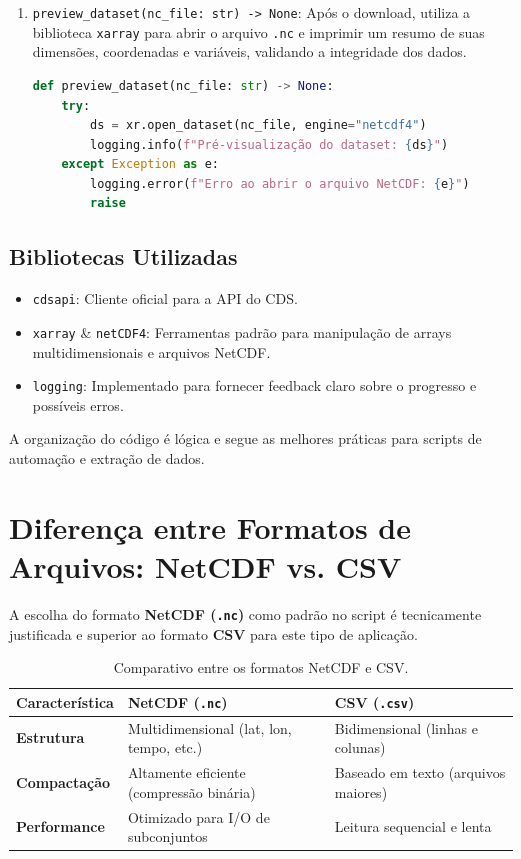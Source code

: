 \documentclass[12pt, a4paper]{article}
\begin{document}
\begin{enumerate}
    \item \texttt{preview\_dataset(nc\_file: str) -> None}: Após o download, utiliza a biblioteca \texttt{xarray} para abrir o arquivo \texttt{.nc} e imprimir um resumo de suas dimensões, coordenadas e variáveis, validando a integridade dos dados.
\begin{lstlisting}[language=Python]
def preview_dataset(nc_file: str) -> None:
    try:
        ds = xr.open_dataset(nc_file, engine="netcdf4")
        logging.info(f"Pré-visualização do dataset: {ds}")
    except Exception as e:
        logging.error(f"Erro ao abrir o arquivo NetCDF: {e}")
        raise
\end{lstlisting}

\end{enumerate}

\subsection{Bibliotecas Utilizadas}
\begin{itemize}
    \item \texttt{cdsapi}: Cliente oficial para a API do CDS.
    \item \texttt{xarray} \& \texttt{netCDF4}: Ferramentas padrão para manipulação de arrays multidimensionais e arquivos NetCDF.
    \item \texttt{logging}: Implementado para fornecer feedback claro sobre o progresso e possíveis erros.
\end{itemize}

A organização do código é lógica e segue as melhores práticas para scripts de automação e extração de dados.

\section{Diferença entre Formatos de Arquivos: NetCDF vs. CSV}

A escolha do formato \textbf{NetCDF (\texttt{.nc})} como padrão no script é tecnicamente justificada e superior ao formato \textbf{CSV} para este tipo de aplicação.

\begin{table}[h!]
\centering
\caption{Comparativo entre os formatos NetCDF e CSV.}
\label{tab:formatos}
\begin{tabular}{@{}lll@{}}
\toprule
\textbf{Característica} & \textbf{NetCDF (\texttt{.nc})} & \textbf{CSV (\texttt{.csv})} \\ \midrule
\textbf{Estrutura} & Multidimensional (lat, lon, tempo, etc.) & Bidimensional (linhas e colunas) \\
\textbf{Compactação} & Altamente eficiente (compressão binária) & Baseado em texto (arquivos maiores) \\
\textbf{Performance} & Otimizado para I/O de subconjuntos & Leitura sequencial e lenta \\ \bottomrule
\end{tabular}
\end{table}
\end{document}
